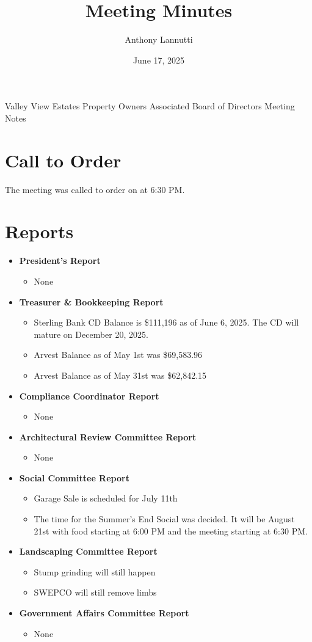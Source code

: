 \documentclass[12pt,a4paper]{article}
\author{Anthony Lannutti}
\date{June 17, 2025}
\title{Meeting Minutes}
\begin{document}
\begin{center}
  Valley View Estates Property Owners Associated Board of Directors Meeting Notes\break{}
  \@date{}
\end{center}

\section*{Call to Order}
\begin{flushleft}
The meeting was called to order on \@date{} at 6:30 PM\@.
\end{flushleft}


\section*{Reports}
\begin{itemize}
  \item \textbf{President's Report}
  \begin{itemize}
    \item None
  \end{itemize}
  \item \textbf{Treasurer \& Bookkeeping Report}
  \begin{itemize}
    \item Sterling Bank CD Balance is \$111,196 as of June 6, 2025. The CD will mature on December 20, 2025.
    \item Arvest Balance as of May 1st was \$69,583.96
    \item Arvest Balance as of May 31st was \$62,842.15
  \end{itemize}
  \item \textbf{Compliance Coordinator Report}
  \begin{itemize}
    \item None
  \end{itemize}
  \item \textbf{Architectural Review Committee Report}
  \begin{itemize}
    \item None
  \end{itemize}
  \item \textbf{Social Committee Report}
  \begin{itemize}
    \item Garage Sale is scheduled for July 11th
    \item The time for the Summer's End Social was decided. It will be August 21st with food starting at 6:00 PM and the meeting starting at 6:30 PM.
  \end{itemize}
  \item \textbf{Landscaping Committee Report}
  \begin{itemize}
    \item Stump grinding will still happen
    \item SWEPCO will still remove limbs
  \end{itemize}
  \item \textbf{Government Affairs Committee Report}
  \begin{itemize}
    \item None
  \end{itemize}
\end{itemize}
\end{document}
